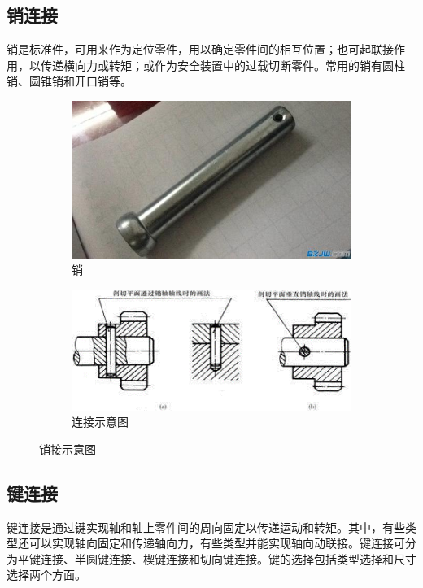 \documentclass[UTF8]{article} %
\begin{document}
\subsection{销连接}
销是标准件，可用来作为定位零件，用以确定零件间的相互位置；也可起联接作用，以传递横向力或转矩；或作为安全装置中的过载切断零件。常用的销有圆柱销、圆锥销和开口销等。

\begin{figure}[H]
  \centering
  \begin{subfigure}[b]{0.35\textwidth}
         \centering
         \includegraphics[width=\textwidth]{xiao1.png}
          \caption{销}
  \end{subfigure}
  \quad
  \begin{subfigure}[b]{0.4\textwidth}
          \centering
          \includegraphics[width=\textwidth]{xiao2.png}
          \caption{连接示意图}
  \end{subfigure}
  \caption{销接示意图}
\end{figure}

\subsection{键连接}
键连接是通过键实现轴和轴上零件间的周向固定以传递运动和转矩。其中，有些类型还可以实现轴向固定和传递轴向力，有些类型并能实现轴向动联接。键连接可分为平键连接、半圆键连接、楔键连接和切向键连接。键的选择包括类型选择和尺寸选择两个方面。
\end{document}
